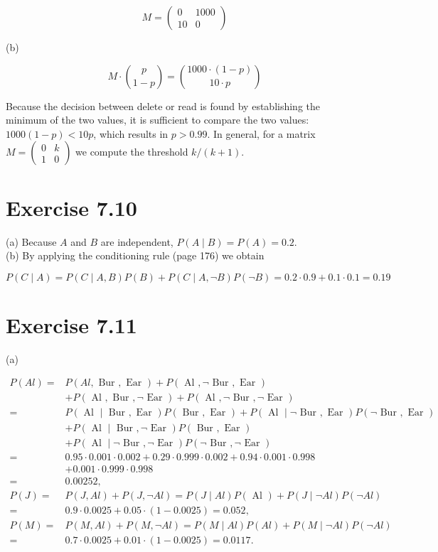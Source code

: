 \documentclass[10pt]{book}
\begin{document}
$$
M=\left(\begin{array}{cc}
0 & 1000 \\
10 & 0
\end{array}\right)
$$

(b)

$$
M \cdot\binom{p}{1-p}=\binom{1000 \cdot(1-p)}{10 \cdot p}
$$

Because the decision between delete or read is found by establishing the minimum of the two values, it is sufficient to compare the two values: $1000(1-p)<10 p$, which results in $p>0.99$. In general, for a matrix $M=\left(\begin{array}{ll}0 & k \\ 1 & 0\end{array}\right)$ we compute the threshold $k /(k+1)$.

\section{Exercise 7.10}
(a) Because $A$ and $B$ are independent, $P(A \mid B)=P(A)=0.2$.\\
(b) By applying the conditioning rule (page 176) we obtain

$$
P(C \mid A)=P(C \mid A, B) P(B)+P(C \mid A, \neg B) P(\neg B)=0.2 \cdot 0.9+0.1 \cdot 0.1=0.19
$$

\section{Exercise 7.11}
(a)

$$
\begin{aligned}
P(A l)= & P(A l, \text { Bur }, \text { Ear })+P(\text { Al }, \neg \text { Bur }, \text { Ear }) \\
& +P(\text { Al }, \text { Bur }, \neg \text { Ear })+P(\text { Al }, \neg \text { Bur }, \neg \text { Ear }) \\
= & P(\text { Al } \mid \text { Bur }, \text { Ear }) P(\text { Bur }, \text { Ear })+P(\text { Al } \mid \neg \text { Bur }, \text { Ear }) P(\neg \text { Bur }, \text { Ear }) \\
& +P(\text { Al } \mid \text { Bur }, \neg \text { Ear }) P(\text { Bur }, \text { Ear }) \\
& +P(\text { Al } \mid \neg \text { Bur }, \neg \text { Ear }) P(\neg \text { Bur }, \neg \text { Ear }) \\
= & 0.95 \cdot 0.001 \cdot 0.002+0.29 \cdot 0.999 \cdot 0.002+0.94 \cdot 0.001 \cdot 0.998 \\
& +0.001 \cdot 0.999 \cdot 0.998 \\
= & 0.00252, \\
P(J)= & P(J, A l)+P(J, \neg A l)=P(J \mid A l) P(\text { Al })+P(J \mid \neg A l) P(\neg A l) \\
= & 0.9 \cdot 0.0025+0.05 \cdot(1-0.0025)=0.052, \\
P(M)= & P(M, A l)+P(M, \neg A l)=P(M \mid A l) P(A l)+P(M \mid \neg A l) P(\neg A l) \\
= & 0.7 \cdot 0.0025+0.01 \cdot(1-0.0025)=0.0117 .
\end{aligned}
$$
\end{document}
